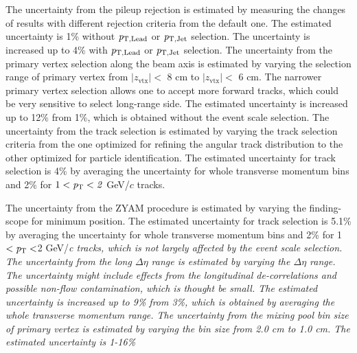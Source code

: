 The uncertainty from the pileup rejection is estimated by measuring the changes of results with different rejection criteria from the default one. The estimated uncertainty is 1\% without $\it{p}_{\rm{T, Lead}}$ or $\it{p}_{\rm{T, Jet}}$ selection. The uncertainty is increased up to 4\% with $\it{p}_{\rm{T, Lead}}$ or $\it{p}_{\rm{T, Jet}}$ selection. The uncertainty from the primary vertex selection along the beam axis is estimated by varying the selection range of primary vertex from $|z_\mathrm{vtx}|<$ 8 cm to $|z_\mathrm{vtx}|<$ 6 cm. The narrower primary vertex selection allows one to accept more forward tracks, which could be very sensitive to select long-range side. The estimated uncertainty is increased up to 12\% from 1\%, which is obtained without the event scale selection. The uncertainty from the track selection is estimated by varying the track selection criteria from the one optimized for refining the angular track distribution to the other optimized for particle identification. The estimated uncertainty for track selection is 4\% by averaging the uncertainty for whole transverse momentum bins and 2\% for $1<\it{p}_{\rm{T}}<2$ GeV/$c$ tracks.

The uncertainty from the ZYAM procedure is estimated by varying the finding-scope for minimum position. The estimated uncertainty for track selection is 5.1\% by averaging the uncertainty for whole transverse momentum bins and 2\% for 1$<\it{p}_{\rm{T}}<$2 GeV/\it{c}\rm{} tracks, which is not largely affected by the event scale selection. The uncertainty from the long $\Delta\eta$ range is estimated by varying the $\Delta\eta$ range. The uncertainty might include effects from the longitudinal de-correlations and possible non-flow contamination, which is thought be small. The estimated uncertainty is increased up to 9\% from 3\%, which is obtained by averaging the whole transverse momentum range.
The uncertainty from the mixing pool bin size of primary vertex is estimated by varying the bin size from 2.0 cm to 1.0 cm. The estimated uncertainty is 1-16\%




\iffalse


